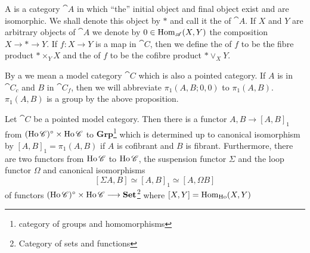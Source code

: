 \documentclass[../main]{subfiles}
\begin{document}
\begin{definition}
    \label{def:1.2.4}
    A  is a category $\cat{A}$ in which ``the'' initial object and final object exist and are isomorphic. We shall denote this object by $*$ and call it the  of $\cat{A}$. If $X$ and $Y$ are arbitrary objects of $\cat{A}$ we denote by $0 \in \operatorname{Hom}_{\mathscr{A}}(X,Y)$ the composition $X \longrightarrow * \longrightarrow Y$. If $f \colon X \longrightarrow Y$ is a map in $\cat{C}$, then we define the  of $f$ to be the fibre product $* \times_Y X$ and the  of $f$ to be the cofibre product $*\vee_X Y$.
    
    By a  we mean a model category $\cat{C}$ which is also a pointed category. If $A$ is in $\cat{C}_c$ and $B$ in $\cat{C}_f$, then we will abbreviate $\pi_1(A,B;0,0)$ to $\pi_1(A,B)$. $\pi_1(A,B)$ is a group by the above proposition.
\end{definition}

\begin{theorem}
    \label{thm:2}
    Let $\cat{C}$ be a pointed model category. Then there is a functor $A,B \longrightarrow [A,B]_1$ from $(\operatorname{Ho}\mathscr{C})^{\circ} \times \operatorname{Ho}\mathscr{C}$ to $\mathbf{Grp}$\footnote{category of groups and homomorphisms} which is determined up to canonical isomorphism by $[A,B]_1 = \pi_1(A,B)$ if $A$ is cofibrant and $B$ is fibrant. Furthermore, there are two functors from $\operatorname{Ho} \mathscr{C}$ to $\operatorname{Ho} \mathscr{C}$, the suspension functor $\Sigma$ and the loop functor $\Omega$ and canonical isomorphisms 
    \[
    [\Sigma A, B] \simeq [A,B]_1 \simeq [A, \Omega B]
    \]
    of functors $(\operatorname{Ho} \mathscr{C})^{\circ} \times \operatorname{Ho} \mathscr{C} \longrightarrow \mathbf{Set}$\footnote{Category of sets and functions} where $[X,Y] = \operatorname{Hom}_{\operatorname{Ho}} (X,Y)$
\end{theorem}
\end{document}
